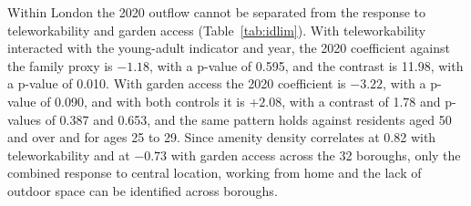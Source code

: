 \documentclass[11pt,a4paper]{article}
\begin{document}
Within London the 2020 outflow cannot be separated from the response to teleworkability and garden access (Table~\ref{tab:idlim}). With teleworkability interacted with the young-adult indicator and year, the 2020 coefficient against the family proxy is $-1.18$, with a p-value of 0.595, and the contrast is 11.98, with a p-value of 0.010. With garden access the 2020 coefficient is $-3.22$, with a p-value of 0.090, and with both controls it is $+2.08$, with a contrast of 1.78 and p-values of 0.387 and 0.653, and the same pattern holds against residents aged 50 and over and for ages 25 to 29. Since amenity density correlates at 0.82 with teleworkability and at $-0.73$ with garden access across the 32 boroughs, only the combined response to central location, working from home and the lack of outdoor space can be identified across boroughs.
\end{document}
